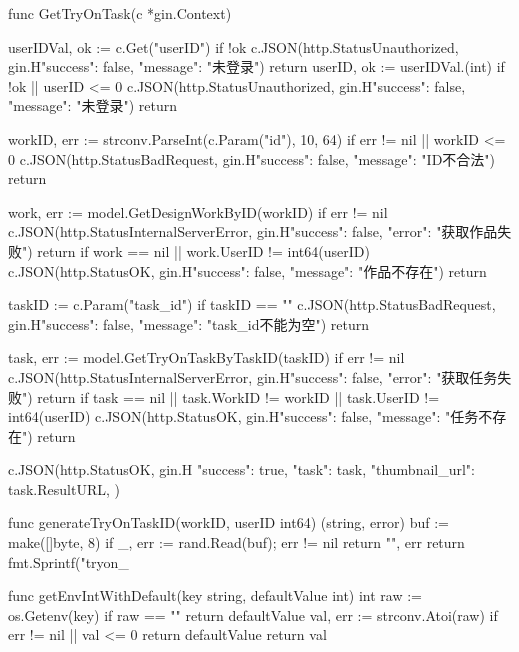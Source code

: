 \documentclass[twoside]{thesis-cls-Miya} %
\begin{document}
func GetTryOnTask(c *gin.Context) {
	userIDVal, ok := c.Get("userID")
	if !ok {
		c.JSON(http.StatusUnauthorized, gin.H{"success": false, "message": "未登录"})
		return
	}
	userID, ok := userIDVal.(int)
	if !ok || userID <= 0 {
		c.JSON(http.StatusUnauthorized, gin.H{"success": false, "message": "未登录"})
		return
	}

	workID, err := strconv.ParseInt(c.Param("id"), 10, 64)
	if err != nil || workID <= 0 {
		c.JSON(http.StatusBadRequest, gin.H{"success": false, "message": "ID不合法"})
		return
	}

	work, err := model.GetDesignWorkByID(workID)
	if err != nil {
		c.JSON(http.StatusInternalServerError, gin.H{"success": false, "error": "获取作品失败"})
		return
	}
	if work == nil || work.UserID != int64(userID) {
		c.JSON(http.StatusOK, gin.H{"success": false, "message": "作品不存在"})
		return
	}

	taskID := c.Param("task_id")
	if taskID == "" {
		c.JSON(http.StatusBadRequest, gin.H{"success": false, "message": "task_id不能为空"})
		return
	}

	task, err := model.GetTryOnTaskByTaskID(taskID)
	if err != nil {
		c.JSON(http.StatusInternalServerError, gin.H{"success": false, "error": "获取任务失败"})
		return
	}
	if task == nil || task.WorkID != workID || task.UserID != int64(userID) {
		c.JSON(http.StatusOK, gin.H{"success": false, "message": "任务不存在"})
		return
	}

	c.JSON(http.StatusOK, gin.H{
		"success":       true,
		"task":          task,
		"thumbnail_url": task.ResultURL,
	})
}

func generateTryOnTaskID(workID, userID int64) (string, error) {
	buf := make([]byte, 8)
	if _, err := rand.Read(buf); err != nil {
		return "", err
	}
	return fmt.Sprintf("tryon_%
}

func getEnvIntWithDefault(key string, defaultValue int) int {
	raw := os.Getenv(key)
	if raw == "" {
		return defaultValue
	}
	val, err := strconv.Atoi(raw)
	if err != nil || val <= 0 {
		return defaultValue
	}
	return val
}
\end{document}
